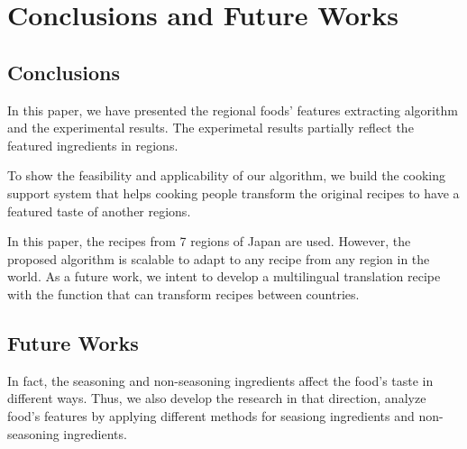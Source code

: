 \chapter{Conclusions and Future Works}\label{chap:conc}
\section{Conclusions}\label{sec:conc_conclucsion}

In this paper, we have presented the regional foods' features extracting algorithm and the experimental results. The experimetal results partially reflect the featured ingredients in regions. 

To show the feasibility and applicability of our algorithm, we build the cooking support system that helps cooking people transform the original recipes to have a featured taste of another regions.  

In this paper, the recipes from 7 regions of Japan are used. However, the proposed algorithm is scalable to adapt to any recipe from any region in the world. As a future work, we intent to develop a multilingual translation recipe with the function that can transform recipes between countries. 


\section{Future Works}\label{sec:conc_future}

In fact, the seasoning and non-seasoning ingredients affect the food's taste in different ways. Thus, we also develop the research in that direction, analyze food's features by applying different methods for seasiong ingredients and non-seasoning ingredients.



